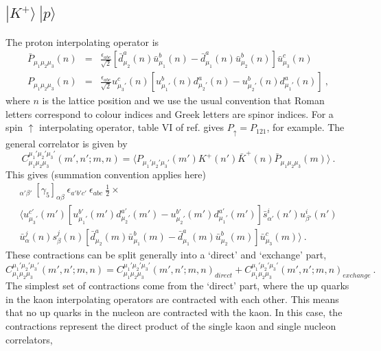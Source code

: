 \documentclass[%
 preprint,
nofootinbib,
 amsmath,amssymb,
 aps,
]{revtex4-2}
\begin{document}
\subsection{$|K^+\rangle\ |p\rangle$}
The proton interpolating operator is \cite{Basak:2005ir}
\begin{eqnarray*}
\bar{P}_{\mu_1\mu_2\mu_3}(n)&=&\frac{\epsilon_{abc}}{\sqrt{2}}\left[\bar{d}^a_{\mu_2}(n)\bar{u}^b_{\mu_1}(n)-\bar{d}^a_{\mu_1}(n)\bar{u}^b_{\mu_2}(n)\right]\bar{u}^c_{\mu_3}(n)\\
P_{\mu_1\mu_2\mu_3}(n)&=&\frac{\epsilon_{abc}}{\sqrt{2}}u^c_{\mu_3'}(n)\left[u^b_{\mu_1'}(n)d^a_{\mu_2'}(n)-u^b_{\mu_2'}(n)d^a_{\mu_1'}(n)\right]\ ,
\end{eqnarray*}
where $n$ is the lattice position and we use the usual convention that Roman letters correspond to colour indices and Greek letters are spinor indices.
For a spin $\uparrow$ interpolating operator, table VI of ref.\cite{Basak:2005ir} gives $P_{\uparrow}=P_{121}$, for example.  The general correlator is given by 
\begin{displaymath}
C^{\mu_1'\mu_2'\mu_3'}_{\mu_1\mu_2\mu_3}(m',n';m,n)=\langle P_{\mu_1'\mu_2'\mu_3'}(m')K^+(n')\bar{K}^+(n)\bar{P}_{\mu_1\mu_2\mu_3}(m)\rangle\ .
\end{displaymath}
This gives (summation convention applies here)
\begin{multline}
[\gamma_5]_{\alpha'\beta'}\ [\gamma_5]_{\alpha\beta}\ \epsilon_{a'b'c'}\ \epsilon_{abc}\  \frac{1}{2}\times\\
\langle 
u^{c'}_{\mu_3'}(m')\left[u^{b'}_{\mu_1'}(m')d^{a'}_{\mu_2'}(m')-u^{b'}_{\mu_2'}(m')d^{a'}_{\mu_1'}(m')\right]
\bar{s}_{\alpha'}^i(n')u_{\beta'}^i(n')\\
\bar{u}_{\alpha}^j(n)s_{\beta}^j(n)
\left[\bar{d}^a_{\mu_2}(m)\bar{u}^b_{\mu_1}(m)-\bar{d}^a_{\mu_1}(m)\bar{u}^b_{\mu_2}(m)\right]\bar{u}^c_{\mu_3}(m)\rangle\ .
\end{multline}
These contractions can be split generally into a `direct' and `exchange' part,
\begin{equation}
C^{\mu_1'\mu_2'\mu_3'}_{\mu_1\mu_2\mu_3}(m',n';m,n)=
C^{\mu_1'\mu_2'\mu_3'}_{\mu_1\mu_2\mu_3}(m',n';m,n)_{direct} +
C^{\mu_1'\mu_2'\mu_3'}_{\mu_1\mu_2\mu_3}(m',n';m,n)_{exchange}\ .
\end{equation}
The simplest set of contractions come from the `direct' part, where the up quarks in the kaon interpolating operators are contracted with each other.  This means that no up quarks in the nucleon are contracted with the kaon.  In this case, the contractions represent the direct product of the single kaon and single nucleon correlators,
\end{document}
